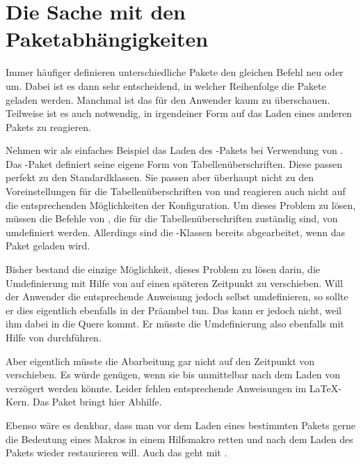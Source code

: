 \section{Die Sache mit den Paketabhängigkeiten}
  Immer häufiger definieren unterschiedliche Pakete den gleichen
  Befehl neu oder um. Dabei ist es dann sehr entscheidend, in welcher
  Reihenfolge die Pakete geladen werden. Manchmal ist das für den
  Anwender kaum zu überschauen. Teilweise ist es auch
  notwendig, in irgendeiner Form auf das Laden eines
  anderen Pakets zu reagieren.

  Nehmen wir als einfaches Beispiel das Laden des
  -Pakets bei Verwendung von \KOMAScript{}. Das
  -Paket definiert seine eigene Form von
  Tabellenüberschriften. Diese passen perfekt zu den
  Standardklassen. Sie passen aber überhaupt
  nicht zu den Voreinstellungen für die Tabellenüberschriften von
  \KOMAScript{} und reagieren auch nicht auf die entsprechenden
  Möglichkeiten der Konfiguration. Um dieses Problem zu lösen, müssen
  die Befehle von , die für die
  Tabellenüberschriften zuständig sind, von \KOMAScript{} umdefiniert
  werden. Allerdings sind die \KOMAScript{}-Klassen bereits
  abgearbeitet, wenn das Paket geladen wird.

  Bisher bestand die einzige Möglichkeit, dieses Problem zu lösen
  darin, die Umdefinierung mit Hilfe von  auf
  einen späteren Zeitpunkt zu verschieben. Will der Anwender die
  entsprechende Anweisung jedoch selbst umdefinieren, so sollte er
  dies eigentlich ebenfalls in der Präambel tun. Das kann er jedoch
  nicht, weil \KOMAScript{} ihm dabei in die Quere kommt. Er müsste
  die Umdefinierung also ebenfalls mit Hilfe von
   durchführen.

  Aber eigentlich müsste \KOMAScript{} die Abarbeitung gar nicht auf
  den Zeitpunkt von  verschieben. Es
  würde genügen, wenn sie bis unmittelbar nach dem Laden von
   verzögert werden könnte. Leider fehlen
  entsprechende Anweisungen im \LaTeX-Kern. Das Paket
   bringt hier Abhilfe.

  Ebenso wäre es denkbar, dass man vor dem Laden eines bestimmten
  Pakets gerne die Bedeutung eines Makros in einem Hilfsmakro retten
  und nach dem Laden des Pakets wieder restaurieren will. Auch das
  geht mit .

